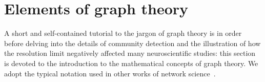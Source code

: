 
\section{Elements of graph theory}\label{sec:elementsofgraphtheory}
A short and self-contained tutorial to the jargon of graph theory is in order before delving into the details of community detection and the illustration of how the resolution limit negatively affected many neuroscientific studies: this section is devoted to the introduction to the mathematical concepts of graph theory.
We adopt the typical notation used in other works of network science~\cite{newman2010book,estrada2011}.

